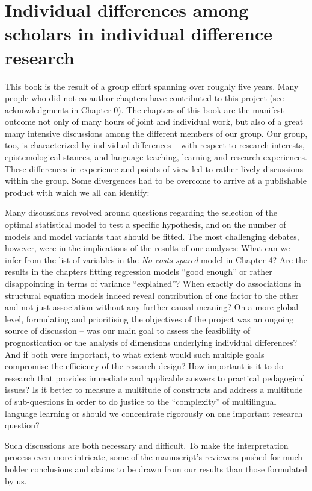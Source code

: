 \documentclass[output=paper]{langsci/langscibook}
\begin{document}
\section{Individual differences among scholars in individual difference research}

This book is the result of a group effort spanning over roughly five years. Many people who did not co-author chapters have contributed to this project (see acknowledgments in Chapter 0). The chapters of this book are the manifest outcome not only of many hours of joint and individual work, but also of a great many intensive discussions among the different members of our group. Our group, too, is characterized by individual differences – with respect to research interests, epistemological stances, and language teaching, learning and research experiences. These differences in experience and points of view led to rather lively discussions within the group. Some divergences had to be overcome to arrive at a publishable product with which we all can identify:

Many discussions revolved around questions regarding the selection of the optimal statistical model to test a specific hypothesis, and on the number of models and model variants that should be fitted. The most challenging debates, however, were in the implications of the results of our analyses: What can we infer from the list of variables in the \textit{No costs spared} model in Chapter 4? Are the results in the chapters fitting regression models ``good enough'' or rather disappointing in terms of variance ``explained''? When exactly do associations in structural equation models indeed reveal contribution of one factor to the other and not just association without any further causal meaning? On a more global level, formulating and prioritising the objectives of the project was an ongoing source of discussion – was our main goal to assess the feasibility of prognostication or the analysis of dimensions underlying individual differences? And if both were important, to what extent would such multiple goals compromise the efficiency of the research design? How important is it to do research that provides immediate and applicable answers to practical pedagogical issues? Is it better to measure a multitude of constructs and address a multitude of sub-questions in order to do justice to the ``complexity'' of multilingual language learning or should we concentrate rigorously on one important research question? 

Such discussions are both necessary and difficult. To make the interpretation process even more intricate, some of the manuscript’s reviewers pushed for much bolder conclusions and claims to be drawn from our results than those formulated by us.
\end{document}
